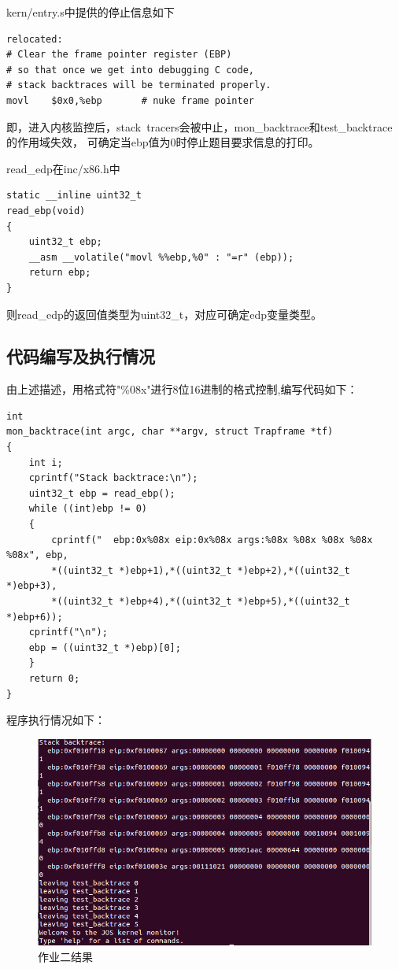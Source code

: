 \documentclass[12pt,a4paper,UTF8]{article}
\begin{document}
	kern/entry.s中提供的停止信息如下
	\begin{lstlisting}[style=CPP]
relocated:
# Clear the frame pointer register (EBP)
# so that once we get into debugging C code,
# stack backtraces will be terminated properly.
movl	$0x0,%ebp		# nuke frame pointer
	\end{lstlisting}

	即，进入内核监控后，stack\ tracers会被中止，mon\_backtrace和test\_backtrace的作用域失效，
	可确定当ebp值为0时停止题目要求信息的打印。

	read\_edp在inc/x86.h中
	\begin{lstlisting}[style=CPP]
static __inline uint32_t
read_ebp(void)
{
	uint32_t ebp;
	__asm __volatile("movl %%ebp,%0" : "=r" (ebp));
	return ebp;
}
	\end{lstlisting}

	则read\_edp的返回值类型为uint32\_t，对应可确定edp变量类型。

	\subsection{代码编写及执行情况}
	由上述描述，用格式符"\%08x"进行8位16进制的格式控制,编写代码如下：
	\begin{lstlisting}[style=CPP]
int
mon_backtrace(int argc, char **argv, struct Trapframe *tf)
{
	int i;
	cprintf("Stack backtrace:\n");
	uint32_t ebp = read_ebp();
	while ((int)ebp != 0)
	{
		cprintf("  ebp:0x%08x eip:0x%08x args:%08x %08x %08x %08x %08x", ebp,
		*((uint32_t *)ebp+1),*((uint32_t *)ebp+2),*((uint32_t *)ebp+3),
		*((uint32_t *)ebp+4),*((uint32_t *)ebp+5),*((uint32_t *)ebp+6));
	cprintf("\n");
	ebp = ((uint32_t *)ebp)[0];
	}
	return 0;
}
	\end{lstlisting}

	程序执行情况如下：
	\begin{figure}[H]
		\centering
		\includegraphics[width = .8\linewidth]{img/7.png}
		\caption{作业二结果}
		\label{fig::figure2-7}
	\end{figure}
\end{document}
